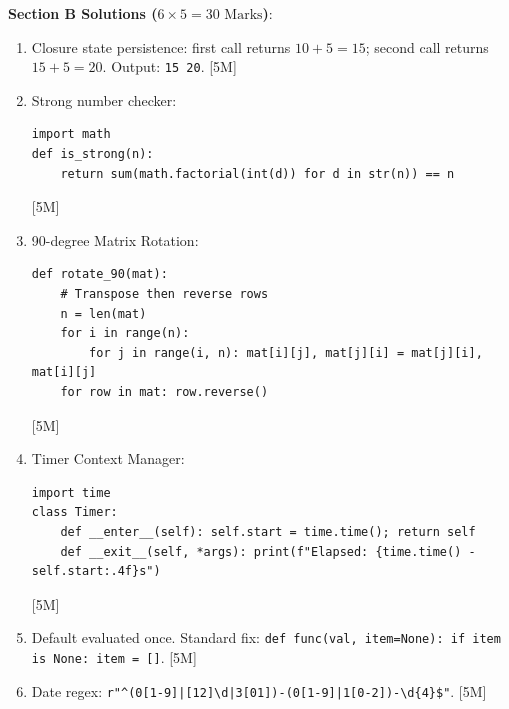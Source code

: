 \begin{solutionbox}
\medskip
\noindent\textbf{Section B Solutions ($6 \times 5 = 30\text{ Marks}$)}:
\begin{enumerate}[start=11]
    \item Closure state persistence: first call returns $10+5 = 15$; second call returns $15+5 = 20$. Output: \texttt{15 20}. [5M]
    \item Strong number checker:
    \begin{lstlisting}[language=Python3]
import math
def is_strong(n):
    return sum(math.factorial(int(d)) for d in str(n)) == n
    \end{lstlisting} [5M]
    \item 90-degree Matrix Rotation:
    \begin{lstlisting}[language=Python3]
def rotate_90(mat):
    # Transpose then reverse rows
    n = len(mat)
    for i in range(n):
        for j in range(i, n): mat[i][j], mat[j][i] = mat[j][i], mat[i][j]
    for row in mat: row.reverse()
    \end{lstlisting} [5M]
    \item Timer Context Manager:
    \begin{lstlisting}[language=Python3]
import time
class Timer:
    def __enter__(self): self.start = time.time(); return self
    def __exit__(self, *args): print(f"Elapsed: {time.time() - self.start:.4f}s")
    \end{lstlisting} [5M]
    \item Default evaluated once. Standard fix: \texttt{def func(val, item=None): if item is None: item = []}. [5M]
    \item Date regex: \texttt{r"\textasciicircum(0[1-9]|[12]\textbackslash d|3[01])-(0[1-9]|1[0-2])-\textbackslash d\{4\}\$"}. [5M]
\end{enumerate}


\end{solutionbox}
